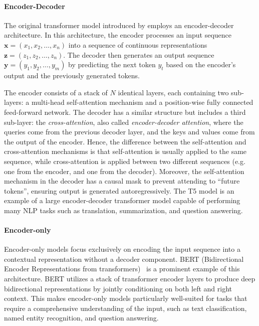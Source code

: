 \paragraph{Encoder-Decoder}
The original transformer model introduced by \cite{vaswani_attention_2017} employs an encoder-decoder architecture. In this architecture, the encoder processes an input sequence $\mathbf{x} = (x_1, x_2, \dots, x_n)$ into a sequence of continuous representations $\mathbf{z} = (z_1, z_2, \dots, z_n)$. The decoder then generates an output sequence $\mathbf{y} = (y_1, y_2, \dots, y_m)$ by predicting the next token $y_t$ based on the encoder's output and the previously generated tokens.

The encoder consists of a stack of $N$ identical layers, each containing two sub-layers: a multi-head self-attention mechanism and a position-wise fully connected feed-forward network. The decoder has a similar structure but includes a third sub-layer: the \emph{cross-attention}, also called \emph{encoder-decoder attention}, where the queries come from the previous decoder layer, and the keys and values come from the output of the encoder. Hence, the difference between the self-attention and cross-attention mechanisms is that self-attention is usually applied to the same sequence, while cross-attention is applied between two different sequences (e.g. one from the encoder, and one from the decoder). Moreover, the self-attention mechanism in the decoder has a causal mask to prevent attending to ``future tokens'', ensuring output is generated autoregressively. The T5 model \parencite{raffel_exploring_2020} is an example of a large encoder-decoder transformer model capable of performing many NLP tasks such as translation, summarization, and question answering.

\paragraph{Encoder-only}
Encoder-only models focus exclusively on encoding the input sequence into a contextual representation without a decoder component. BERT (Bidirectional Encoder Representations from transformers)~\cite{devlin_bert_2019} is a prominent example of this architecture. BERT utilizes a stack of transformer encoder layers to produce deep bidirectional representations by jointly conditioning on both left and right context. This makes encoder-only models particularly well-suited for tasks that require a comprehensive understanding of the input, such as text classification, named entity recognition, and question answering.


